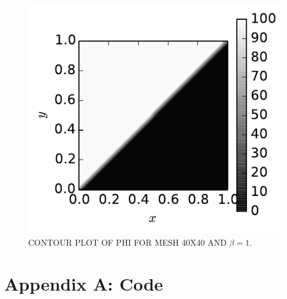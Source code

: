\documentclass[cleanfoot,cleanhead,twocolumn,10pt,notitlepage]{asme2e}
\begin{document}
\begin{figure}[t]
\begin{center}
    \includegraphics[width=\linewidth]{../Project2_code/output/Phi.pdf}
    \caption{CONTOUR PLOT OF PHI FOR MESH 40X40 AND $\beta = 1.$}
    \label{fig:contour}
\end{center}
\end{figure}
\clearpage

\appendix

\section*{Appendix A: Code}


\end{document}
